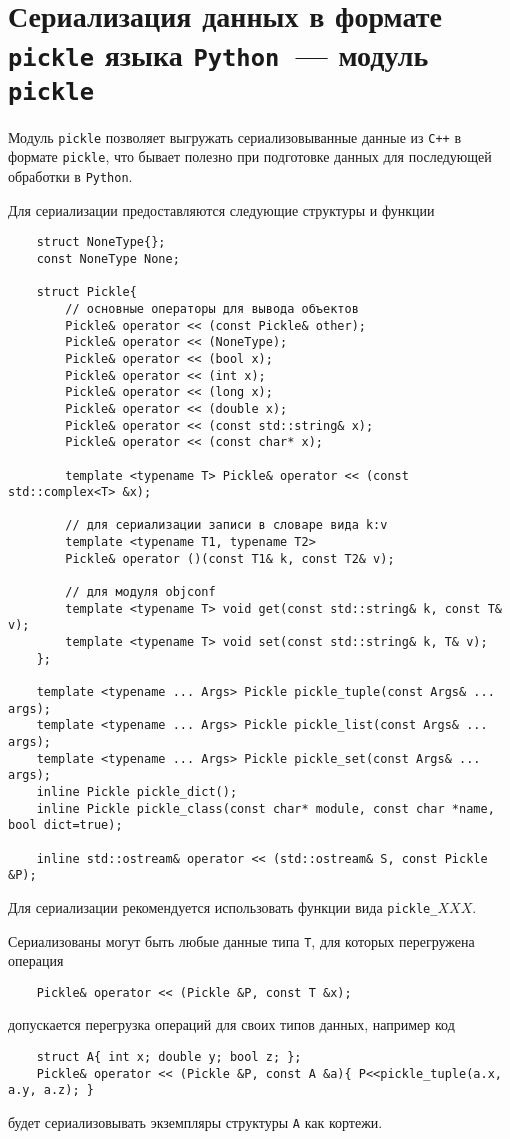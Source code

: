\section{Сериализация данных в формате {\tt pickle} языка {\tt Python}~--- модуль {\tt pickle}}\label{pickle:sec}
Модуль \verb'pickle' позволяет выгружать сериализовыванные данные из \verb'C++' в формате \verb'pickle',
что бывает полезно при подготовке данных  для последующей обработки в \verb'Python'.

Для сериализации предоставляются следующие структуры и функции
\begin{verbatim}
    struct NoneType{};
    const NoneType None;

    struct Pickle{
        // основные операторы для вывода объектов
        Pickle& operator << (const Pickle& other);
        Pickle& operator << (NoneType);
        Pickle& operator << (bool x);
        Pickle& operator << (int x);
        Pickle& operator << (long x);
        Pickle& operator << (double x);
        Pickle& operator << (const std::string& x); 		
        Pickle& operator << (const char* x);

        template <typename T> Pickle& operator << (const std::complex<T> &x);
		
        // для сериализации записи в словаре вида k:v
        template <typename T1, typename T2> 
        Pickle& operator ()(const T1& k, const T2& v);

        // для модуля objconf 
        template <typename T> void get(const std::string& k, const T& v);
        template <typename T> void set(const std::string& k, T& v);
    };

    template <typename ... Args> Pickle pickle_tuple(const Args& ... args);
    template <typename ... Args> Pickle pickle_list(const Args& ... args);
    template <typename ... Args> Pickle pickle_set(const Args& ... args);
    inline Pickle pickle_dict();
    inline Pickle pickle_class(const char* module, const char *name, bool dict=true);
    
    inline std::ostream& operator << (std::ostream& S, const Pickle &P);
\end{verbatim}
Для сериализации рекомендуется использовать функции вида \verb'pickle_'$XXX$.

Сериализованы могут быть любые данные типа \verb'T', для которых перегружена операция
\begin{verbatim}
    Pickle& operator << (Pickle &P, const T &x);
\end{verbatim}
допускается перегрузка операций для своих типов данных, например код
\begin{verbatim}
    struct A{ int x; double y; bool z; };
    Pickle& operator << (Pickle &P, const A &a){ P<<pickle_tuple(a.x, a.y, a.z); }
\end{verbatim}
будет сериализовывать экземпляры структуры \verb'A' как кортежи. 

